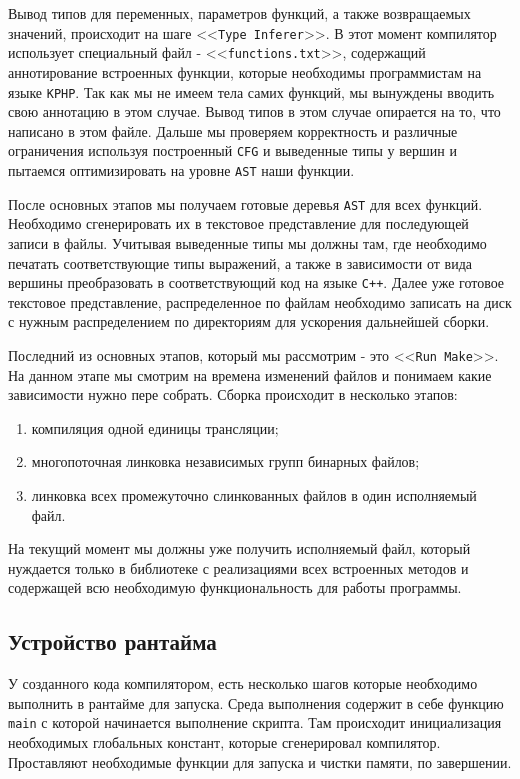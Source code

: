 Вывод типов для переменных, параметров функций, а также возвращаемых значений, происходит на шаге <<\verb|Type Inferer|>>.
В этот момент компилятор использует специальный файл - <<\verb|functions.txt|>>, содержащий аннотирование встроенных функции, которые необходимы программистам на языке \verb|KPHP|.
Так как мы не имеем тела самих функций, мы вынуждены вводить свою аннотацию в этом случае.
Вывод типов в этом случае опирается на то, что написано в этом файле.
Дальше мы проверяем корректность и различные ограничения используя построенный \verb|CFG| и выведенные типы у вершин и пытаемся оптимизировать на уровне \verb|AST| наши функции.

После основных этапов мы получаем готовые деревья \verb|AST| для всех функций.
Необходимо сгенерировать их в текстовое представление для последующей записи в файлы.
Учитывая выведенные типы мы должны там, где необходимо печатать соответствующие типы выражений, а также в зависимости от вида вершины преобразовать в соответствующий код на языке \verb|C++|.
Далее уже готовое текстовое представление, распределенное по файлам необходимо записать на диск с нужным распределением по директориям для ускорения дальнейшей сборки.

Последний из основных этапов, который мы рассмотрим - это <<\verb|Run Make|>>.
На данном этапе мы смотрим на времена изменений файлов и понимаем какие зависимости нужно пере собрать.
Сборка происходит в несколько этапов:
\begin{enumerate}
  \item компиляция одной единицы трансляции;
  \item многопоточная линковка независимых групп бинарных файлов;
  \item линковка всех промежуточно слинкованных файлов в один исполняемый файл.
\end{enumerate}

На текущий момент мы должны уже получить исполняемый файл, который нуждается только в библиотеке с реализациями всех встроенных методов и содержащей всю необходимую функциональность для работы программы.

\subsection{Устройство рантайма}
\label{sec2:runtime_principle}
У созданного кода компилятором, есть несколько шагов которые необходимо выполнить в рантайме для запуска.
Среда выполнения содержит в себе функцию \verb|main| с которой начинается выполнение скрипта.
Там происходит инициализация необходимых глобальных констант, которые сгенерировал компилятор.
Проставляют необходимые функции для запуска и чистки памяти, по завершении.


